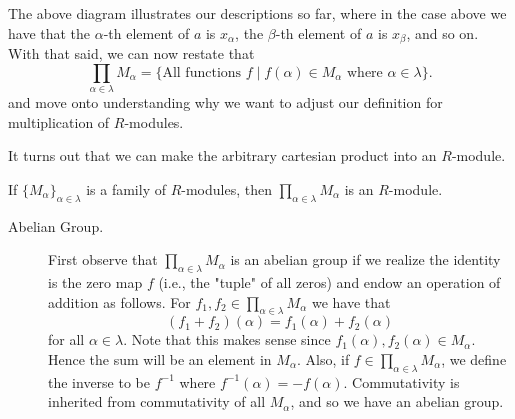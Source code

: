 \documentclass[12pt,letterpaper]{algebra_book}
\theoremstyle{definition}
\begin{document}
\begin{definition}
\begin{center}
    \end{center}
    \textcolor{NavyBlue}{
    The above diagram illustrates our descriptions so far, where
    in the case above we have that the $\alpha$-th element of $a$
    is $x_\alpha$, the $\beta$-th element of $a$ is $x_\beta$, and
    so on. With
    that said, we can now restate that 
    \[
        \prod_{\alpha \in \lambda} M_\alpha = \{\text{All functions } f \mid  f(\alpha) \in M_\alpha \text{ where } \alpha \in \lambda \}.
    \]
    and move onto understanding why we want to
    adjust our definition for multiplication of $R$-modules. 
    }

    It turns out that we can make the arbitrary cartesian product
    into an $R$-module. 

    \begin{proposition}
        If $\{M_\alpha\}_{\alpha \in \lambda}$ is a family of
        $R$-modules, then $\displaystyle \prod_{\alpha \in 
        \lambda}M_{\alpha}$ is an $R$-module.
    \end{proposition}

    \begin{prf}
        \begin{description}
            \item[Abelian Group.] First observe that $\displaystyle
            \prod_{\alpha \in \lambda} M_\alpha$ is an abelian group
            if we realize the identity is the zero map $f$ (i.e., the
            "tuple" of all zeros) and endow an operation of addition as follows. For
            $f_1,
            f_2 \in \displaystyle \prod_{\alpha \in \lambda} M_\alpha$
            we have that 
            \[
                (f_1 + f_2)(\alpha) = f_1(\alpha) + f_2(\alpha)
            \]
            for all $\alpha \in \lambda$. Note that this makes sense
            since $f_1(\alpha), f_2(\alpha) \in M_\alpha$. Hence the
            sum will be an element in $M_\alpha$. Also, if $f \in
            \displaystyle \prod_{\alpha \in \lambda} M_\alpha$, we
            define the inverse to be $f^{-1}$ where $f^{-1}(\alpha) =
            -f(\alpha)$. Commutativity is inherited from commutativity
            of all $M_\alpha$, and so we have an abelian group.


\end{description}
\end{prf}
\end{definition}
\end{document}
